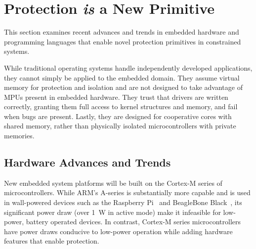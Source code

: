 \section{Protection \emph{is} a New Primitive}
\label{protection}


%
This section examines recent advances and trends in embedded hardware and
programming languages that enable novel protection primitives in constrained
systems.

While traditional operating systems handle independently developed applications,
they cannot simply be applied to the embedded domain. They assume virtual memory
for protection and isolation and are not designed to take advantage of MPUs
present in embedded hardware. They trust that drivers are written correctly,
granting them full access to kernel structures and memory, and fail when bugs
are present. Lastly, they are designed for cooperative cores with shared memory,
rather than physically isolated microcontrollers with private memories.


\subsection{Hardware Advances and Trends}

New embedded system platforms will be built on the Cortex-M series of microcontrollers.
While ARM's A-series is substantially more capable and is used in wall-powered
devices such as the Raspberry Pi~\cite{rpi} and BeagleBone Black~\cite{bbb},
its significant power draw (over 1~W in active mode) make it infeasible for
low-power, battery operated devices.
In contrast, Cortex-M series microcontrollers have power draws conducive to
low-power operation while adding hardware features that enable protection.



